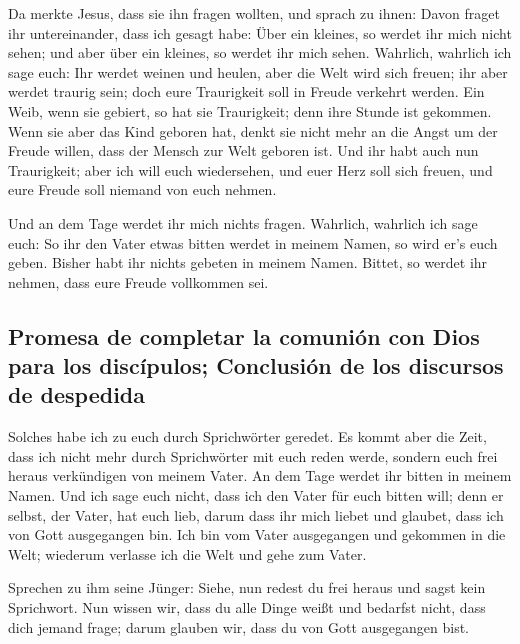  Da merkte Jesus, dass sie ihn fragen wollten, und sprach
zu ihnen: Davon fraget ihr untereinander, dass ich gesagt habe: Über ein
kleines, so werdet ihr mich nicht sehen; und aber über ein kleines, so
werdet ihr mich sehen.  Wahrlich, wahrlich ich sage euch:
Ihr werdet weinen und heulen, aber die Welt wird sich freuen; ihr aber
werdet traurig sein; doch eure Traurigkeit soll in Freude verkehrt
werden.  Ein Weib, wenn sie gebiert, so hat sie
Traurigkeit; denn ihre Stunde ist gekommen. Wenn sie aber das Kind
geboren hat, denkt sie nicht mehr an die Angst um der Freude willen,
dass der Mensch zur Welt geboren ist.  Und ihr habt auch
nun Traurigkeit; aber ich will euch wiedersehen, und euer Herz soll sich
freuen, und eure Freude soll niemand von euch nehmen.

 Und an dem Tage werdet ihr mich nichts fragen. Wahrlich,
wahrlich ich sage euch: So ihr den Vater etwas bitten werdet in meinem
Namen, so wird er's euch geben.  Bisher habt ihr nichts
gebeten in meinem Namen. Bittet, so werdet ihr nehmen, dass eure Freude
vollkommen sei.

\hypertarget{promesa-de-completar-la-comuniuxf3n-con-dios-para-los-discuxedpulos-conclusiuxf3n-de-los-discursos-de-despedida}{%
\subsection{Promesa de completar la comunión con Dios para los
discípulos; Conclusión de los discursos de
despedida}\label{promesa-de-completar-la-comuniuxf3n-con-dios-para-los-discuxedpulos-conclusiuxf3n-de-los-discursos-de-despedida}}

 Solches habe ich zu euch durch Sprichwörter geredet. Es
kommt aber die Zeit, dass ich nicht mehr durch Sprichwörter mit euch
reden werde, sondern euch frei heraus verkündigen von meinem Vater.
 An dem Tage werdet ihr bitten in meinem Namen. Und ich
sage euch nicht, dass ich den Vater für euch bitten will;
 denn er selbst, der Vater, hat euch lieb, darum dass ihr
mich liebet und glaubet, dass ich von Gott ausgegangen bin.
 Ich bin vom Vater ausgegangen und gekommen in die Welt;
wiederum verlasse ich die Welt und gehe zum Vater.

 Sprechen zu ihm seine Jünger: Siehe, nun redest du frei
heraus und sagst kein Sprichwort.  Nun wissen wir, dass
du alle Dinge weißt und bedarfst nicht, dass dich jemand frage; darum
glauben wir, dass du von Gott ausgegangen bist.

